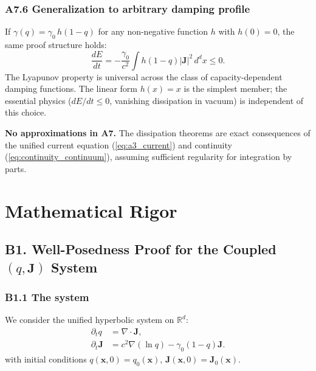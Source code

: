 \documentclass[reprint]{revtex4-2}
\begin{document}
\subsubsection{A7.6 Generalization to arbitrary damping profile}

If $\gamma(q) = \gamma_0\,h(1-q)$ for any non-negative function $h$ with $h(0)=0$, the same proof structure holds:
\begin{equation}
\frac{dE}{dt} = -\frac{\gamma_0}{c^2}\int h(1-q)|\mathbf{J}|^2\,d^d x \le 0.
\end{equation}
The Lyapunov property is universal across the class of capacity-dependent damping functions. The linear form $h(x)=x$ is the simplest member; the essential physics ($dE/dt\le 0$, vanishing dissipation in vacuum) is independent of this choice.

\textbf{No approximations in A7.} The dissipation theorems are exact consequences of the unified current equation (\ref{eq:a3_current}) and continuity (\ref{eq:continuity_continuum}), assuming sufficient regularity for integration by parts.

\section{Mathematical Rigor}

\subsection{B1. Well-Posedness Proof for the Coupled $(q,\mathbf{J})$ System}

\subsubsection{B1.1 The system}

We consider the unified hyperbolic system on $\mathbb{R}^d$:
\begin{align}
\partial_t q &= \nabla\cdot\mathbf{J}, \label{eq:sys1_v3}\\
\partial_t\mathbf{J} &= c^2\nabla(\ln q) - \gamma_0(1-q)\mathbf{J}. \label{eq:sys2_v3}
\end{align}
with initial conditions $q(\mathbf{x},0)=q_0(\mathbf{x})$, $\mathbf{J}(\mathbf{x},0)=\mathbf{J}_0(\mathbf{x})$.
\end{document}
